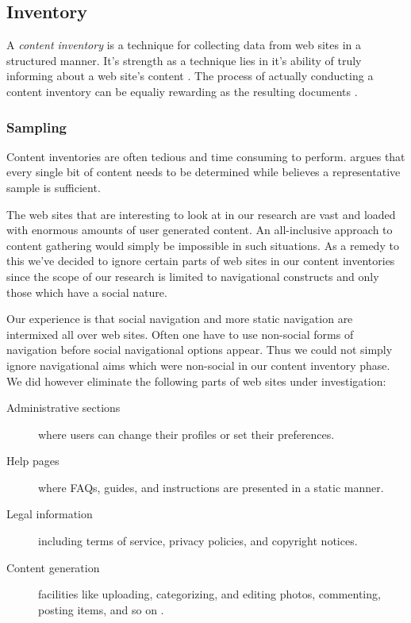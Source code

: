 \subsection{Inventory}

A \emph{content inventory} is a technique for collecting data from web sites
in a structured manner. It's strength as a technique lies in it's ability of
truly informing about a web site's content \citep{wodtke02}. The process of
actually conducting a content inventory can be equaliy rewarding as the
resulting documents \citep{veen02}.

\subsubsection{Sampling}
\label{section:methodology.content.analysis.sampling}

Content inventories are often tedious and time consuming to perform.
\citet[p.~267]{wodtke02} argues that every single bit of content needs to be
determined while \citet[p.~241]{morville06} believes a representative sample
is sufficient.

The web sites that are interesting to look at in our research are vast and
loaded with enormous amounts of user generated content. An all-inclusive
approach to content gathering would simply be impossible in such situations.
As a remedy to this we've decided to ignore certain parts of web sites in our
content inventories since the scope of our research is limited to navigational
constructs and only those which have a social nature.

Our experience is that social navigation and more static navigation are
intermixed all over web sites. Often one have to use non-social forms of
navigation before social navigational options appear. Thus we could not simply
ignore navigational aims which were non-social in our content inventory phase.
We did however eliminate the following parts of web sites under investigation:

\begin{description}
  \item[Administrative sections] where users can change their profiles or set
    their preferences.
  \item[Help pages] where FAQs, guides, and instructions are presented in a
    static manner.
  \item[Legal information] including terms of service, privacy policies, and
    copyright notices.
  \item[Content generation] facilities like uploading, categorizing, and
    editing photos, commenting, posting items, and so on%
    .
\end{description}

